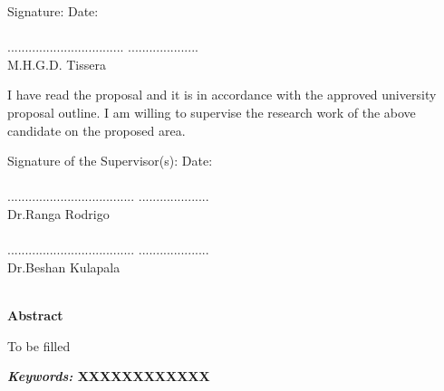 \documentclass[a4paper,oneside,12pt]{report}
\begin{document}
Signature:  \hspace{7cm}  Date:\\
\\
................................. \hspace{5cm} ....................\\
M.H.G.D. Tissera

I have read the proposal and it is in accordance with the approved university proposal outline. I am willing to supervise the research work of the above candidate on the proposed area.

Signature of the Supervisor(s):  \hspace{3.25cm}  Date:\\
\\
.................................... \hspace{4.25cm} ....................\\
Dr.Ranga Rodrigo\\
\\
.................................... \hspace{4.25cm} ....................\\
Dr.Beshan Kulapala\\
\\


\clearpage


\begin{flushleft}
	\large
	\textbf{Abstract}
\end{flushleft}
\small

To be filled 

\cite{R01} \cite{R02} \cite{R03} \cite{R04} \cite{R05} \cite{R06} \cite{R07} \cite{R08} \cite{R09} \cite{R10} \cite{R11} \cite{R12} \cite{R13} \cite{R14} \cite{R15} \cite{R16} \cite{R17} \cite{R18} \cite{R19} \cite{R20} \cite{R21} \cite{R22} \cite{R23} \cite{R24} \cite{R25} \cite{R26} \cite{R27} \cite{R28} \cite{R29} \cite{R30} \cite{R31} \cite{R32} \cite{R33} \cite{R34} \cite{R35} \cite{R36} \cite{R37} \cite{R38} \cite{R39} \cite{R40} \cite{R41} \cite{R42} \cite{R43} \cite{R44} \cite{R45} \cite{R46} \cite{R47} \cite{R48}
\cite{R49} \cite{R50} \cite{R51} \cite{R52} \cite{R53} \cite{R54} \cite{R55} \cite{R56} \cite{R57} \cite{R58} \cite{R59} \cite{R60}
\cite{R61} \cite{R62} \cite{R63} \cite{R64} \cite{R65} \cite{R66}


\textbf{\textit{Keywords:} XXXXXXXXXXXX}



\setlength{\parindent}{5mm}
\normalsize
{}
\end{document}

